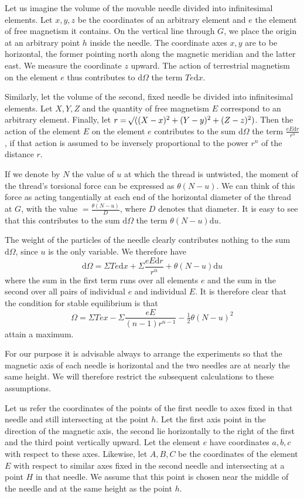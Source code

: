 Let us imagine the volume of the movable needle divided into infinitesimal elements. Let $x,y,z$ be the coordinates of an arbitrary element and $e$ the element of free magnetism it contains. On the vertical line through $G$, we place the origin at an arbitrary point $h$ inside the needle. The coordinate axes $x,y$ are to be horizontal, the former pointing north along the magnetic meridian and the latter east. We measure the coordinate $z$ upward. The action of terrestrial magnetism on the element $e$ thus contributes to $\mathrm{d}\Omega$ the term $Te\mathrm{d}x$.

Similarly, let the volume of the second, fixed needle be divided into infinitesimal elements. Let $X,Y,Z$ and the quantity of free magnetism $E$ correspond to an arbitrary element. Finally, let $r=\mathord{{}^{}\!\surd}((X-x)^2+(Y-y)^2+(Z-z)^2)$. Then the action of the element $E$ on the element $e$ contributes to the sum $\mathrm{d}\Omega$ the term $\frac{eE\mathrm{d}r}{r^n}$, if that action is assumed to be inversely proportional to the power $r^n$ of the distance $r$.

If we denote by $N$ the value of $u$ at which the thread is untwisted, the moment of the thread's torsional force can be expressed as $\theta(N-u)$. We can think of this force as acting tangentially at each end of the horizontal diameter of the thread at $G$, with the value $=\frac{\theta(N-u)}{D}$, where $D$ denotes that diameter. It is easy to see that this contributes to the sum $\mathrm{d}\Omega$ the term $\theta(N-u)\mathrm{d}u$.

The weight of the particles of the needle clearly contributes nothing to the sum $\mathrm{d}\Omega$, since $u$ is the only variable. We therefore have
\[
\mathrm{d}\Omega=\Sigma Te\mathrm{d}x+\Sigma\frac{eE\mathrm{d}r}{r^n}+\theta(N-u)\mathrm{d}u
\]
where the sum in the first term runs over all elements $e$ and the sum in the second over all pairs of individual $e$ and individual $E$. It is therefore clear that the condition for stable equilibrium is that
\[
\Omega=\Sigma Tex-\Sigma\frac{eE}{(n-1)r^{n-1}}-\tfrac12\theta(N-u)^2
\]
attain a maximum.

For our purpose it is advisable always to arrange the experiments so that the magnetic axis of each needle is horizontal and the two needles are at nearly the same height. We will therefore restrict the subsequent calculations to these assumptions.

Let us refer the coordinates of the points of the first needle to axes fixed in that needle and still intersecting at the point $h$. Let the first axis point in the direction of the magnetic axis, the second lie horizontally to the right of the first and the third point vertically upward. Let the element $e$ have coordinates $a,b,c$ with respect to these axes. Likewise, let $A,B,C$ be the coordinates of the element $E$ with respect to similar axes fixed in the second needle and intersecting at a point $H$ in that needle. We assume that this point is chosen near the middle of the needle and at the same height as the point $h$.

